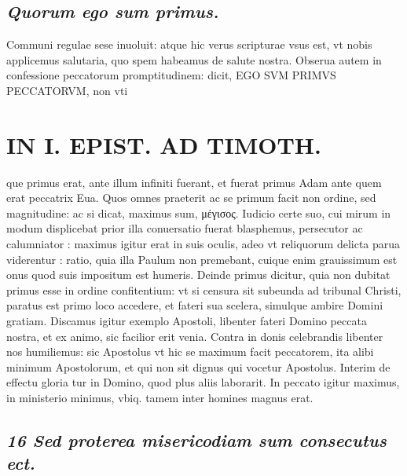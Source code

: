\documentclass{article}
\begin{document}
\begin{pages}
\subsection*{\textit{Quorum ego sum primus. }}\pstart Communi regulae sese inuoluit: atque hic verus scripturae vsus est, vt nobis applicemus salutaria, quo spem habeamus de salute nostra. Obserua autem in confessione peccatorum promptitudinem: dicit, EGO SVM PRIMVS PECCATORVM, non vti\pend
\section*{IN I. EPIST. AD TIMOTH. }
\marginpar{[ p.35 ]}\pstart que primus erat, ante illum infiniti fuerant, et fuerat primus Adam ante quem erat peccatrix Eua. Quos omnes praeterit ac se primum facit non ordine, sed magnitudine: ac si dicat, maximus sum, μέγισος. Iudicio certe suo, cui mirum in modum displicebat prior illa conuersatio fuerat blasphemus, persecutor ac calumniator : maximus igitur erat in suis oculis, adeo vt reliquorum delicta parua viderentur : ratio, quia illa Paulum non premebant, cuique enim grauissimum est onus quod suis impositum est humeris. Deinde primus dicitur, quia non dubitat primus esse in ordine confitentium: vt si censura sit subeunda ad tribunal Christi, paratus est primo loco accedere, et fateri sua scelera, simulque ambire Domini gratiam. Discamus igitur exemplo Apostoli, libenter fateri Domino peccata nostra, et ex animo, sic facilior erit venia. Contra in donis celebrandis libenter nos humiliemus: sic Apostolus vt hic se maximum facit peccatorem, ita alibi minimum Apostolorum, et qui non sit dignus qui vocetur Apostolus. Interim de effectu gloria tur in Domino, quod plus aliis laborarit. In peccato igitur maximus, in ministerio minimus, vbiq. tamem inter homines magnus erat.  \pend
{}
{}
\subsection*{\textit{16 Sed proterea misericodiam sum consecutus ect. }}

\end{pages}
\end{document}
